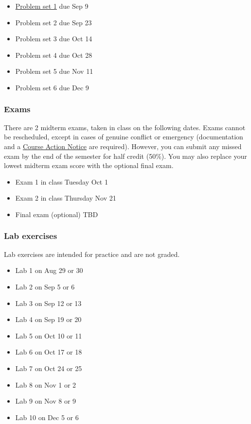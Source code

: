 \documentclass[
  letterpaper,
  DIV=11,
  numbers=noendperiod]{scrartcl}
\providecommand{\tightlist}{%
  \setlength{\itemsep}{0pt}\setlength{\parskip}{0pt}}\usepackage{longtable,booktabs,array}
\begin{document}
\begin{itemize}
\tightlist
\item
  \href{}{Problem set 1} due Sep 9
\item
  Problem set 2 due Sep 23
\item
  Problem set 3 due Oct 14
\item
  Problem set 4 due Oct 28
\item
  Problem set 5 due Nov 11
\item
  Problem set 6 due Dec 9
\end{itemize}

\hypertarget{exams}{%
\subsubsection{Exams}\label{exams}}

There are 2 midterm exams, taken in class on the following dates. Exams
cannot be rescheduled, except in cases of genuine conflict or emergency
(documentation and a
\href{https://srfs.upenn.edu/student-records/course-action-notices}{Course
Action Notice} are required). However, you can submit any missed exam by
the end of the semester for half credit (50\%). You may also replace
your lowest midterm exam score with the optional final exam.

\begin{itemize}
\tightlist
\item
  Exam 1 in class Tuesday Oct 1
\item
  Exam 2 in class Thursday Nov 21
\item
  Final exam (optional) TBD
\end{itemize}

\hypertarget{lab-exercises}{%
\subsubsection{Lab exercises}\label{lab-exercises}}

Lab exercises are intended for practice and are not graded.

\begin{itemize}
\tightlist
\item
  Lab 1 on Aug 29 or 30
\item
  Lab 2 on Sep 5 or 6
\item
  Lab 3 on Sep 12 or 13
\item
  Lab 4 on Sep 19 or 20
\item
  Lab 5 on Oct 10 or 11
\item
  Lab 6 on Oct 17 or 18
\item
  Lab 7 on Oct 24 or 25
\item
  Lab 8 on Nov 1 or 2
\item
  Lab 9 on Nov 8 or 9
\item
  Lab 10 on Dec 5 or 6
\end{itemize}
\end{document}
